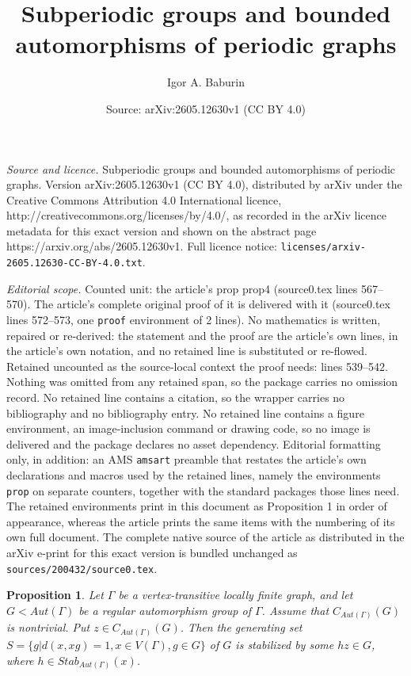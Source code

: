\documentclass[10pt,a4paper]{amsart}
\title{Subperiodic groups and bounded automorphisms of periodic graphs}
\author{Igor A. Baburin}
\date{Source: arXiv:2605.12630v1 (CC BY 4.0)}
\newtheorem{prop}{Proposition}
\begin{document}
\maketitle

\noindent\emph{Source and licence.} Subperiodic groups and bounded automorphisms of periodic graphs. Version arXiv:2605.12630v1 (CC BY 4.0), distributed by arXiv under the Creative Commons Attribution 4.0 International licence, http://creativecommons.org/licenses/by/4.0/, as recorded in the arXiv licence metadata for this exact version and shown on the abstract page https://arxiv.org/abs/2605.12630v1. Full licence notice: \texttt{licenses/arxiv-2605.12630-CC-BY-4.0.txt}.\par\smallskip

\noindent\textit{Editorial scope.} Counted unit: the article's prop prop4 (source0.tex lines 567--570). The article's complete original proof of it is delivered with it (source0.tex lines 572--573, one \texttt{proof} environment of 2 lines). No mathematics is written, repaired or re-derived: the statement and the proof are the article's own lines, in the article's own notation, and no retained line is substituted or re-flowed.  Retained uncounted as the source-local context the proof needs: lines 539--542.  Nothing was omitted from any retained span, so the package carries no omission record.  No retained line contains a citation, so the wrapper carries no bibliography and no bibliography entry.  No retained line contains a figure environment, an image-inclusion command or drawing code, so no image is delivered and the package declares no asset dependency.  Editorial formatting only, in addition: an AMS \texttt{amsart} preamble that restates the article's own declarations and macros used by the retained lines, namely the environments \texttt{prop} on separate counters, together with the standard packages those lines need.  The retained environments print in this document as Proposition 1 in order of appearance, whereas the article prints the same items with the numbering of its own full document.  The complete native source of the article as distributed in the arXiv e-print for this exact version is bundled unchanged as \texttt{sources/200432/source0.tex}.
\begin{prop}
\label{prop2}
Let $\Gamma$ be a vertex-transitive locally finite graph, and let $G < Aut(\Gamma)$ be a regular automorphism group of $\Gamma$. Assume that $C_{Aut(\Gamma)}(G)$ is nontrivial. Put $z \in C_{Aut(\Gamma)}(G)$. Then the generating set $S = \{g | d(x, xg) = 1, x \in V(\Gamma), g \in G \}$ of $G$ is stabilized by some $hz \in G$, where $h \in Stab_{Aut(\Gamma)}(x)$. %
\end{prop}
\end{document}
